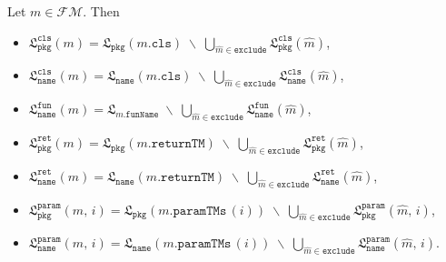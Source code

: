 \documentclass{article}
\newcommand{\lang}{\mathfrak{L}}
\begin{document}
Let $m \in \mathcal{FM}$. Then
\begin{itemize}
    \item $\lang_\texttt{pkg}^\texttt{cls}(m) = \lang_\texttt{pkg}(m.\texttt{cls}) \;\backslash\; \bigcup\limits_{\hat{m} \in \texttt{exclude}} \lang_\texttt{pkg}^\texttt{cls}(\hat{m})$,

    \item $\lang_\texttt{name}^\texttt{cls}(m) = \lang_\texttt{name}(m.\texttt{cls}) \;\backslash\; \bigcup\limits_{\hat{m} \in \texttt{exclude}} \lang_\texttt{name}^\texttt{cls}(\hat{m})$,

    \item $\lang_\texttt{name}^\texttt{fun}(m) = \lang_{m.\texttt{funName}} \;\backslash\; \bigcup\limits_{\hat{m} \in \texttt{exclude}} \lang_\texttt{name}^\texttt{fun}(\hat{m})$,

    \item $\lang_\texttt{pkg}^\texttt{ret}(m) = \lang_\texttt{pkg}(m.\texttt{returnTM}) \;\backslash\; \bigcup\limits_{\hat{m} \in \texttt{exclude}} \lang_\texttt{pkg}^\texttt{ret}(\hat{m})$,

    \item $\lang_\texttt{name}^\texttt{ret}(m) = \lang_\texttt{name}(m.\texttt{returnTM}) \;\backslash\; \bigcup\limits_{\hat{m} \in \texttt{exclude}} \lang_\texttt{name}^\texttt{ret}(\hat{m})$,

    \item $\lang_\texttt{pkg}^\texttt{param}(m,\, i) = \lang_\texttt{pkg}(m.\texttt{paramTMs}\,(i)) \;\backslash\; \bigcup\limits_{\hat{m} \in \texttt{exclude}} \lang_\texttt{pkg}^\texttt{param}(\hat{m},\, i)$,

    \item $\lang_\texttt{name}^\texttt{param}(m,\, i) = \lang_\texttt{name}(m.\texttt{paramTMs}\,(i)) \;\backslash\; \bigcup\limits_{\hat{m} \in \texttt{exclude}} \lang_\texttt{name}^\texttt{param}(\hat{m},\, i)$.
    \end{itemize}
\end{document}
